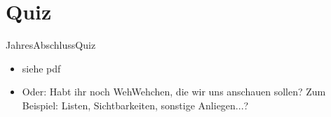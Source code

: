 \documentclass[18pt]{beamer}
\begin{document}
\section{Quiz}
\begin{frame}[fragile]{JahresAbschlussQuiz}
\begin{itemize}
	\item siehe pdf \newline 
  \vspace{1cm}
  \item Oder: Habt ihr noch WehWehchen, die wir uns anschauen sollen? \newline
		\footnotesize Zum Beispiel: Listen, Sichtbarkeiten, sonstige Anliegen...?
\end{itemize}

\end{frame}



\appendix
\beginbackup


\backupend
\end{document}
